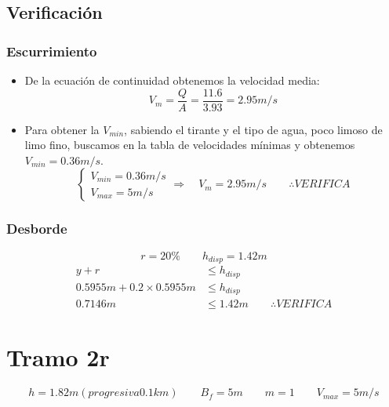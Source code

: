 \documentclass[10.5pt]{article}
\begin{document}
\subsection*{Verificación}

\subsubsection*{Escurrimiento}

\begin{itemize}
 \item De la ecuación de continuidad obtenemos la velocidad media:
    \begin{equation*}
    V_{m} = \dfrac{Q}{A} = \dfrac{11.6}{3.93} = 2.95 m/s
    \end{equation*}
 \item Para obtener la $V_{min}$, sabiendo el tirante y el tipo de agua, poco limoso de limo fino, buscamos en
 la tabla de velocidades mínimas y obtenemos $V_{min} = 0.36 m/s$.
    \begin{equation*}
      \begin{cases}
      V_{min} = 0.36 m/s \\
      V_{max} = 5 m/s
      \end{cases}
      \Longrightarrow \quad
      V_{m} = 2.95 m/s
      \qquad
      \therefore VERIFICA
    \end{equation*}
\end{itemize}

\subsubsection*{Desborde}

\begin{equation*}
 r = 20\%
 \qquad
 h_{disp} = 1.42 m
\end{equation*}
\begin{align*}
 y + r &\leq h_{disp} \\
 0.5955 m + 0.2 \times 0.5955 m &\leq h_{disp} \\
 0.7146 m &\leq 1.42 m
 \qquad
 \therefore VERIFICA
\end{align*}



\section*{Tramo 2r}


\begin{equation*}
  h = 1.82 m (progresiva 0.1 km)
 \qquad
  B_{f} = 5 m
 \qquad
  m = 1
 \qquad
  V_{max} = 5 m/s
\end{equation*}
\end{document}
